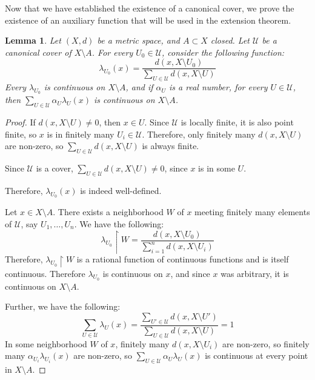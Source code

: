 \documentclass[openany, amssymb, psamsfonts]{amsart}
\newtheorem{lem}{Lemma}[section]
\theoremstyle{definition}
\numberwithin{equation}{section}
\begin{document}
Now that we have established the existence of a canonical cover, we prove the existence of an auxiliary function that will be used in the extension theorem.
\begin{lem}\label{lem:3.26}
  Let $(X,d)$ be a metric space, and $A \subset X$ closed. Let $\mathcal{U}$ be a canonical cover of $X\setminus A$. For every $U_0 \in \mathcal{U}$, consider the following function:
  \begin{equation*}
    \lambda_{U_0}(x) = \displaystyle\frac{d(x, X \setminus U_0)}{\displaystyle\sum_{U\in \mathcal{U}}d(x, X \setminus U)}
  \end{equation*}
  Every $\lambda_{U_0}$ is continuous on $X\setminus A$, and if $\alpha_U$ is a real number, for every $U \in \mathcal{U}$, then $\displaystyle\sum_{U \in \mathcal{U}} \alpha_U \lambda_U(x)$ is continuous on $X\setminus A$.
\end{lem}
\begin{proof}
  If $d(x, X\setminus U) \neq 0$, then $x \in U$. Since $\mathcal{U}$ is locally finite, it is also point finite, so $x$ is in finitely many $U_i \in \mathcal{U}$. Therefore, only finitely many $d(x, X\setminus U)$ are non-zero, so $\sum_{U\in \mathcal{U}} d(x, X\setminus U)$ is always finite. 

  Since $\mathcal{U}$ is a cover, $\sum_{U \in \mathcal{U}} d(x, X\setminus U) \neq 0$, since $x$ is in some $U$. 

  Therefore, $\lambda_{U_0}(x)$ is indeed well-defined. 

  Let $x \in X \setminus A$. There exists a neighborhood $W$ of $x$ meeting finitely many elements of $\mathcal{U}$, say $U_1, \ldots, U_n$. We have the following:
  \[
    \lambda_{U_0}\restriction W = \displaystyle\frac{d(x, X \setminus U_0)}{\displaystyle\sum_{i=1}^{n}d(x, X \setminus U_i)}
  \]
  Therefore, $\lambda_{U_0}\restriction W$ is a rational function of continuous functions and is itself continuous. Therefore $\lambda_{U_0}$ is continuous on $x$, and since $x$ was arbitrary, it is continuous on $X\setminus A$. 

  Further, we have the following:
  \[
    \displaystyle\sum_{U \in \mathcal{U}} \lambda_U(x) = \displaystyle\frac{\sum_{U' \in \mathcal{U}} d(x, X \setminus U')}{\sum_{U \in \mathcal{U}} d(x, X \setminus U)} = 1
  \]
  In some neighborhood $W$ of $x$, finitely many $d(x, X \setminus U_i)$ are non-zero, so finitely many $\alpha_{U_i}\lambda_{U_i}(x)$ are non-zero, so $\sum_{U \in \mathcal{U}} \alpha_U\lambda_U(x)$ is continuous at every point in $X \setminus A$. 
\end{proof}
\end{document}
